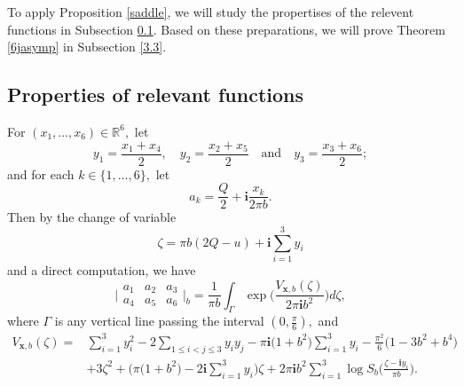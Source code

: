 \documentclass[11pt]{article}
\theoremstyle{remark}
\theoremstyle{remark}
\numberwithin{equation}{section}
\begin{document}
To apply Proposition \ref{saddle}, we will study the propertises of the  relevent functions in Subsection \ref{3.2}. Based on these preparations, we will prove Theorem \ref{6jasymp} in Subsection \ref{3.3}.





\subsection{Properties of relevant functions}\label{3.2}






For $(x_1,\dots,x_6)\in\mathbb R^6,$ let 
$$y_1=\frac{x_1+x_4}{2},\quad y_2=\frac{x_2+x_5}{2}\quad\text{and}\quad y_3=\frac{x_3+x_6}{2};$$
and for each  $k\in\{1,\dots,6\},$ let 
$$a_k = \frac{Q}{2} + \mathbf i \frac{x_k}{2\pi b}.$$ 
Then by the change of variable 
$$\zeta =\pi b(2Q-u)+\mathbf i\sum_{i=1}^3y_i$$
and a direct computation, we have
\begin{equation}\label{idealb6j}
    \bigg|\begin{matrix} a_1 & a_2 & a_3 \\ a_4 & a_5 & a_6 \end{matrix} \bigg|_b= \frac{1}{\pi b}\int_\Gamma \exp\bigg(\frac{V_{\boldsymbol x,b}(\zeta)}{2\pi\mathbf i b^2}\bigg)d\zeta,
\end{equation}
where  $\Gamma$ is any vertical line passing the interval $(0,\frac{\pi}{6}),$ and 
\begin{equation}\label{Vxb}
\begin{split}
    V_{\boldsymbol x,b}(\zeta)=&\sum_{i=1}^3y_i^2-2\sum_{1\leqslant i< j\leqslant 3}y_iy_j-\pi\mathbf i \big(1+b^2\big)\sum_{i=1}^3y_i-\frac{\pi^2}{6}\big(1-3b^2+b^4\big)\\
    & + 3\zeta^2+\bigg(\pi\big(1+b^2)-2\mathbf i \sum_{i=1}^3y_i\bigg)\zeta+2\pi\mathbf i b^2\sum_{i=1}^3\log S_b\bigg(\frac{\zeta-\mathbf i y_i}{\pi b}\bigg).
\end{split}
\end{equation} 
\end{document}
